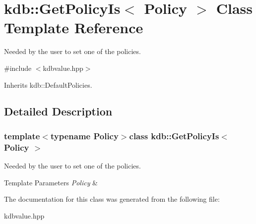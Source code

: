\hypertarget{classkdb_1_1GetPolicyIs}{\section{kdb\-:\-:Get\-Policy\-Is$<$ Policy $>$ Class Template Reference}
\label{classkdb_1_1GetPolicyIs}
}


Needed by the user to set one of the policies.  




{\ttfamily \#include $<$kdbvalue.\-hpp$>$}



Inherits kdb\-::\-Default\-Policies.



\subsection{Detailed Description}
\subsubsection*{template$<$typename Policy$>$class kdb\-::\-Get\-Policy\-Is$<$ Policy $>$}

Needed by the user to set one of the policies. 


\begin{DoxyTemplParams}{Template Parameters}
{\em Policy} & \\
\hline
\end{DoxyTemplParams}


The documentation for this class was generated from the following file\-:\begin{DoxyCompactItemize}
\item 
kdbvalue.\-hpp\end{DoxyCompactItemize}
